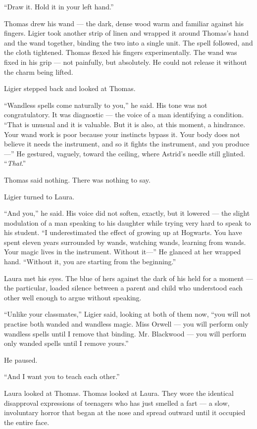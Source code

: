 \enquote{Draw it. Hold it in your left hand.}
 
Thomas drew his wand --- the dark, dense wood warm and familiar against his fingers. Ligier took another strip of linen and wrapped it around Thomas's hand and the wand together, binding the two into a single unit. The spell followed, and the cloth tightened. Thomas flexed his fingers experimentally. The wand was fixed in his grip --- not painfully, but absolutely. He could not release it without the charm being lifted.
 
Ligier stepped back and looked at Thomas.
 
\enquote{Wandless spells come naturally to you,} he said. His tone was not congratulatory. It was diagnostic --- the voice of a man identifying a condition. \enquote{That is unusual and it is valuable. But it is also, at this moment, a hindrance. Your wand work is poor because your instincts bypass it. Your body does not believe it needs the instrument, and so it fights the instrument, and you produce---} He gestured, vaguely, toward the ceiling, where Astrid's needle still glinted. \enquote{\textit{That}.}
 
Thomas said nothing. There was nothing to say.
 
Ligier turned to Laura.
 
\enquote{And you,} he said. His voice did not soften, exactly, but it lowered --- the slight modulation of a man speaking to his daughter while trying very hard to speak to his student. \enquote{I underestimated the effect of growing up at Hogwarts. You have spent eleven years surrounded by wands, watching wands, learning from wands. Your magic lives in the instrument. Without it---} He glanced at her wrapped hand. \enquote{Without it, you are starting from the beginning.}
 
Laura met his eyes. The blue of hers against the dark of his held for a moment --- the particular, loaded silence between a parent and child who understood each other well enough to argue without speaking.
 
\enquote{Unlike your classmates,} Ligier said, looking at both of them now, \enquote{you will not practise both wanded and wandless magic. Miss Orwell --- you will perform only wandless spells until I remove that binding. Mr. Blackwood --- you will perform only wanded spells until I remove yours.}
 
He paused.
 
\enquote{And I want you to teach each other.}
 
Laura looked at Thomas. Thomas looked at Laura. They wore the identical disapproval expressions of teenagers who has just smelled a fart --- a slow, involuntary horror that began at the nose and spread outward until it occupied the entire face.
 

